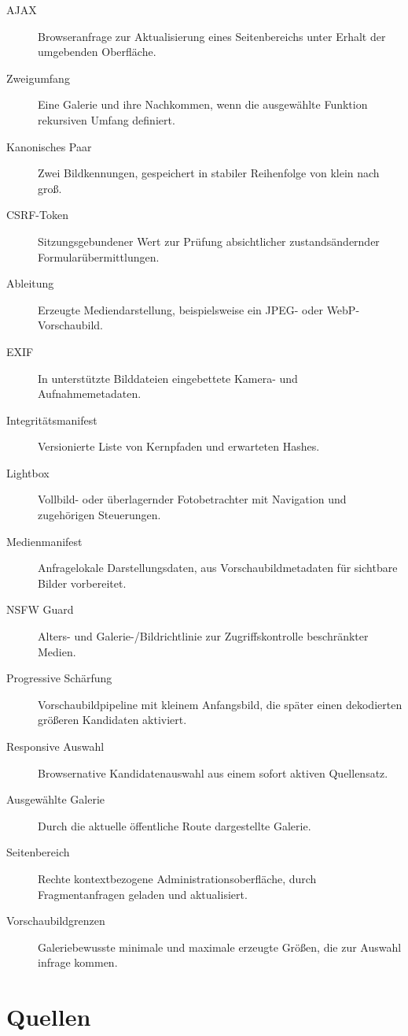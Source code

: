 \documentclass[11pt,a4paper]{article}
\begin{document}
\begin{description}
  \item[AJAX] Browseranfrage zur Aktualisierung eines Seitenbereichs unter
  Erhalt der umgebenden Oberfläche.
  \item[Zweigumfang] Eine Galerie und ihre Nachkommen, wenn die ausgewählte
  Funktion rekursiven Umfang definiert.
  \item[Kanonisches Paar] Zwei Bildkennungen, gespeichert in stabiler
  Reihenfolge von klein nach groß.
  \item[CSRF-Token] Sitzungsgebundener Wert zur Prüfung absichtlicher
  zustandsändernder Formularübermittlungen.
  \item[Ableitung] Erzeugte Mediendarstellung, beispielsweise ein JPEG- oder
  WebP-Vorschaubild.
  \item[EXIF] In unterstützte Bilddateien eingebettete Kamera- und
  Aufnahmemetadaten.
  \item[Integritätsmanifest] Versionierte Liste von Kernpfaden und erwarteten
  Hashes.
  \item[Lightbox] Vollbild- oder überlagernder Fotobetrachter mit Navigation und
  zugehörigen Steuerungen.
  \item[Medienmanifest] Anfragelokale Darstellungsdaten, aus
  Vorschaubildmetadaten für sichtbare Bilder vorbereitet.
  \item[NSFW Guard] Alters- und Galerie-/Bildrichtlinie zur Zugriffskontrolle
  beschränkter Medien.
  \item[Progressive Schärfung] Vorschaubildpipeline mit kleinem Anfangsbild, die
  später einen dekodierten größeren Kandidaten aktiviert.
  \item[Responsive Auswahl] Browsernative Kandidatenauswahl aus einem sofort
  aktiven Quellensatz.
  \item[Ausgewählte Galerie] Durch die aktuelle öffentliche Route dargestellte
  Galerie.
  \item[Seitenbereich] Rechte kontextbezogene Administrationsoberfläche, durch
  Fragmentanfragen geladen und aktualisiert.
  \item[Vorschaubildgrenzen] Galeriebewusste minimale und maximale erzeugte
  Größen, die zur Auswahl infrage kommen.
\end{description}

\clearpage
\section{Quellen}
\label{sec:references}
\end{document}
